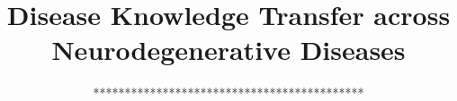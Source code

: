 \documentclass{llncs}
\begin{document}

\title{Disease Knowledge Transfer across Neurodegenerative Diseases}
%
%

% 
% 

\author{*******************************************}

\institute{***************************************}


\maketitle              %


\newcommand{\expFld}{../resfiles/tad-drcTiny_JMD}
\newcommand{\jmdFld}{..}
\end{document}

